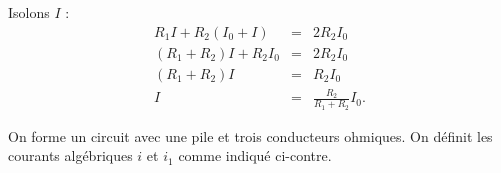 
\begin{corrige}
	Isolons $I$ : \minusSmallskip
	\[
		\begin{array}{rcl}
			R_1I+R_2(I_0+I)		&=&2R_2 I_0		\\
			(R_1+R_2)I+R_2I_0	&=&2R_2 I_0		\\
			(R_1+R_2)I			&=&R_2 I_0		\\
			I					&=&\frac{R_2}{R_1+R_2}I_0.
		\end{array}
	\]	
	
\end{corrige}




\finEntrainement

\newpage






\hauteurLargeurCadreReponse		{7mm}{50mm}
\typeEntrainement				{} %
\initialisationEntrainement


                                \initialisationPartieGauche %
On forme un circuit avec une pile et trois conducteurs ohmiques. On définit les courants algébriques $i$ et $i_1$ comme indiqué ci-contre. 

